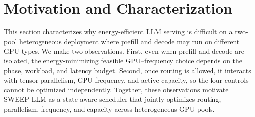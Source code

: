 \section{Motivation and Characterization}
\label{sec:motivation}


This section characterizes why energy-efficient LLM serving is difficult on a two-pool heterogeneous deployment where prefill and decode may run on different GPU types. 
We make two observations. 
First, even when prefill and decode are isolated, the energy-minimizing feasible GPU--frequency choice depends on the phase, workload, and latency budget. 
Second, once routing is allowed, it interacts with tensor parallelism, GPU frequency, and active capacity, so the four controls cannot be optimized independently. 
Together, these observations motivate SWEEP-LLM as a state-aware scheduler that jointly optimizes routing, parallelism, frequency, and capacity across heterogeneous GPU pools.



